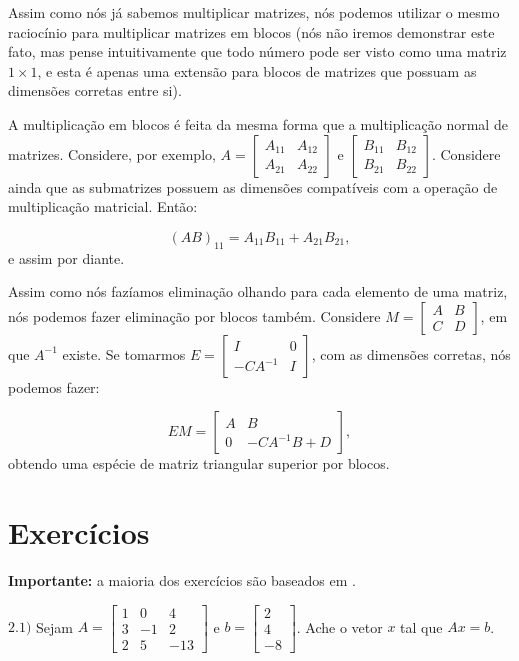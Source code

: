 Assim como nós já sabemos multiplicar matrizes, nós podemos utilizar o mesmo raciocínio para multiplicar matrizes em blocos (nós não iremos demonstrar este fato, mas pense intuitivamente que todo número pode ser visto como uma matriz $1\times 1$, e esta é apenas uma extensão para blocos de matrizes que possuam as dimensões corretas entre si).

A multiplicação em blocos é feita da mesma forma que a multiplicação normal de matrizes. Considere, por exemplo, $A = \begin{bmatrix}
	A_{11} & A_{12} \\
	A_{21} & A_{22}
\end{bmatrix}$ e $\begin{bmatrix}
	B_{11} & B_{12} \\
	B_{21} & B_{22}
\end{bmatrix}$. Considere ainda que as submatrizes possuem as dimensões compatíveis com a operação de multiplicação matricial. Então:

$$
(AB)_{11} = A_{11}B_{11} + A_{21}B_{21},
$$
e assim por diante.

Assim como nós fazíamos eliminação olhando para cada elemento de uma matriz, nós podemos fazer eliminação por blocos também. Considere $M = \begin{bmatrix}
	A & B \\
	C & D
\end{bmatrix}$, em que $A^{-1}$ existe. Se tomarmos $E = \begin{bmatrix}
	I & 0 \\
	-CA^{-1} & I
\end{bmatrix}$, com as dimensões corretas, nós podemos fazer:

$$
EM = \begin{bmatrix}
	A & B \\
	0 & -CA^{-1}B + D
\end{bmatrix},
$$
obtendo uma espécie de matriz triangular superior por blocos.

\section{Exercícios}

\textbf{Importante:} a maioria dos exercícios são baseados em \cite{lista1doguilherme}.

\noindent $\mathbf{2.1)}$ Sejam $A = \begin{bmatrix}
	1 & 0 & 4 \\
	3 & -1 & 2 \\
	2 & 5 & -13
\end{bmatrix}$ e $b = \begin{bmatrix}
	2 \\
	4 \\
	-8
\end{bmatrix}$. Ache o vetor $x$ tal que $Ax = b$.

